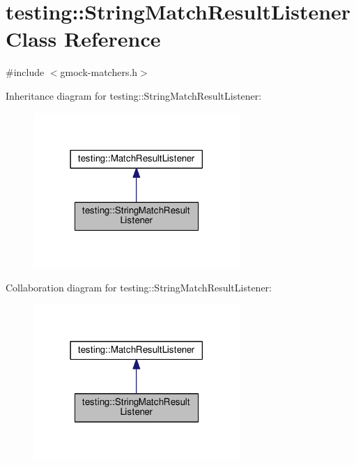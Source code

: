 \hypertarget{classtesting_1_1StringMatchResultListener}{}\section{testing\+:\+:String\+Match\+Result\+Listener Class Reference}
\label{classtesting_1_1StringMatchResultListener}


{\ttfamily \#include $<$gmock-\/matchers.\+h$>$}



Inheritance diagram for testing\+:\+:String\+Match\+Result\+Listener\+:
\nopagebreak
\begin{figure}[H]
\begin{center}
\leavevmode
\includegraphics[width=222pt]{classtesting_1_1StringMatchResultListener__inherit__graph}
\end{center}
\end{figure}


Collaboration diagram for testing\+:\+:String\+Match\+Result\+Listener\+:
\nopagebreak
\begin{figure}[H]
\begin{center}
\leavevmode
\includegraphics[width=222pt]{classtesting_1_1StringMatchResultListener__coll__graph}
\end{center}
\end{figure}
